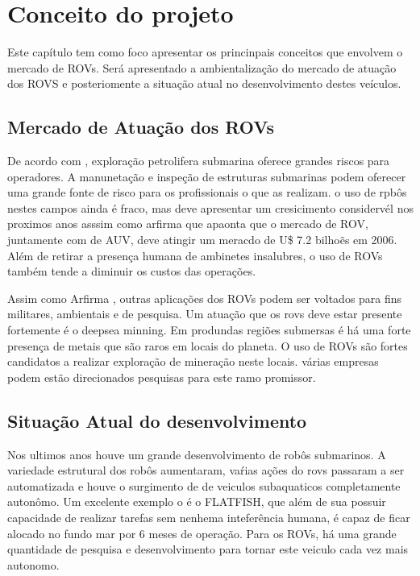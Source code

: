 \chapter{Conceito do projeto}
\label{chap:fundteor}

Este capítulo tem  como foco apresentar os princinpais conceitos que envolvem o mercado de ROVs. Será apresentado a ambientalização do mercado de atuação dos ROVS e posteriomente a situação atual no desenvolvimento  destes veículos.

\section{Mercado de Atuação dos ROVs}


De acordo com \cite{Bogue1}, exploração petrolifera submarina oferece grandes riscos para operadores. 
A manunetação e inspeção de estruturas submarinas podem oferecer uma grande fonte de risco para os profissionais o que as realizam. o uso de rpbôs nestes campos ainda é fraco, mas deve apresentar um cresicimento considervél nos proximos anos asssim como arfirma \cite{yahoo_finaces}  que apaonta que o mercado de ROV, juntamente com de AUV, deve atingir um meracdo de U\$ 7.2 bilhoẽs em 2006. Além de retirar a presença humana de ambinetes insalubres,  o uso de ROVs também tende a diminuir os custos das operações.

Assim como Arfirma \cite{Bogue2}, outras aplicações dos ROVs podem ser voltados para fins militares, ambientais e de pesquisa. Um atuação que os rovs deve estar presente fortemente é o deepsea minning. Em produndas regiões submersas é há uma forte presença de metais que são raros em locais do planeta. O uso de ROVs são fortes candidatos a realizar exploração de mineração neste locais. várias empresas podem estão direcionados pesquisas para  este ramo promissor.


\section{Situação Atual do desenvolvimento}

Nos ultimos anos houve um grande desenvolvimento de robôs submarinos.  A variedade estrutural dos robôs aumentaram, vaŕias ações do rovs passaram a ser automatizada e houve o surgimento de de veiculos subaquaticos completamente autonômo. Um excelente exemplo o é o FLATFISH, que além de sua possuir capacidade de realizar tarefas sem nenhema inteferência humana, é capaz de ficar alocado no fundo mar por 6 meses de operação.
Para os ROVs, há uma grande quantidade de pesquisa  e desenvolvimento para tornar este veiculo cada vez mais autonomo.




